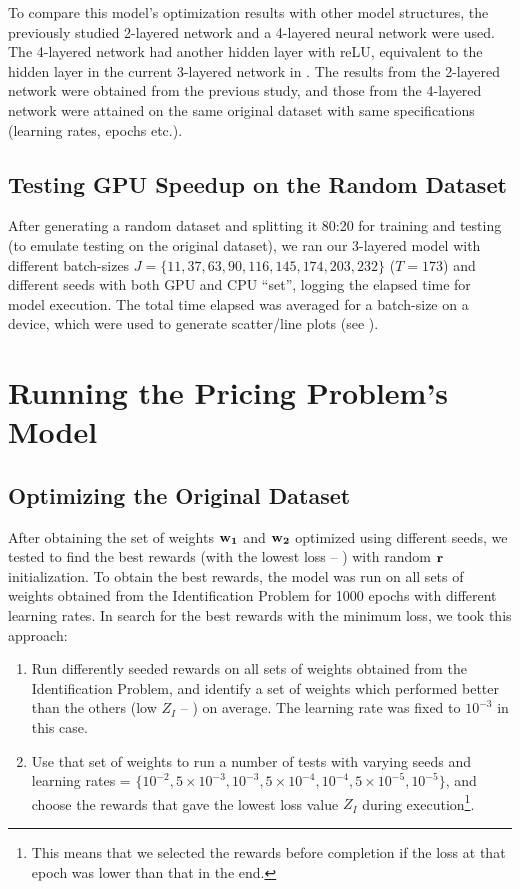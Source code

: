 To compare this model's optimization results with other model structures, the previously studied 2-layered network \cite{Xue2016Avi2} and a 4-layered neural network were used. The 4-layered network had another hidden layer with reLU, equivalent to the hidden layer in the current 3-layered network in . The results from the 2-layered network were obtained from the previous study, and those from the 4-layered network were attained on the same original dataset with same specifications (learning rates, epochs etc.).

\subsection{Testing GPU Speedup on the Random Dataset} \label{sec:Identification Problem-Testing GPU Speedup on the Random Dataset}
After generating a random dataset and splitting it 80:20 for training and testing (to emulate testing on the original dataset), we ran our 3-layered model with different batch-sizes $J = \{11,37,63,90,116,145,174,203,232\}$ ($T = 173$) and different seeds with both GPU and CPU ``set'', logging the elapsed time for model execution. The total time elapsed was averaged for a batch-size on a device, which were used to generate scatter/line plots (see ).

\section{Running the Pricing Problem's Model} \label{sec:Running the Pricing Problem's Model}
\subsection{Optimizing the Original Dataset} \label{sec:Pricing Problem-Optimizing the Original Dataset}
After obtaining the set of weights $\mathbf{w_1}$ and $\mathbf{w_2}$ optimized using different seeds, we tested to find the best rewards (with the lowest loss -- ) with random $\mathbf{r}$ initialization. To obtain the best rewards, the model was run on all sets of weights obtained from the Identification Problem for 1000 epochs with different learning rates. In search for the best rewards with the minimum loss, we took this approach:
\begin{enumerate}
    \item Run differently seeded rewards on all sets of weights obtained from the Identification Problem, and identify a set of weights which performed better than the others (low $Z_I$ -- ) on average. The learning rate was fixed to $10^{-3}$ in this case.
    \item Use that set of weights to run a number of tests with varying seeds and learning rates = $\{10^{-2}, 5 \times 10^{-3}, 10^{-3}, 5 \times 10^{-4}, 10^{-4}, 5 \times 10^{-5}, 10^{-5}\}$, and choose the rewards that gave the lowest loss value $Z_I$ during execution\footnote{This means that we selected the rewards before completion if the loss at that epoch was lower than that in the end.}. 
\end{enumerate}

